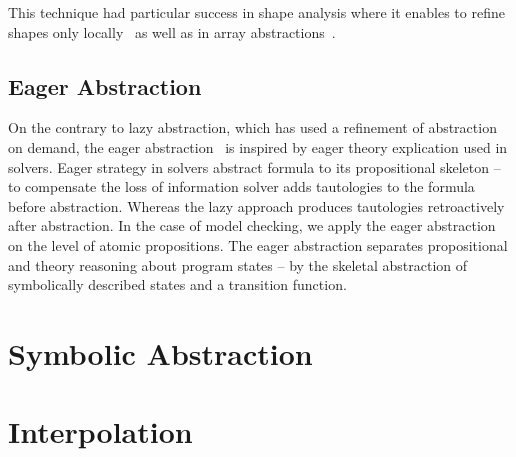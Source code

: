 This technique had particular success in shape analysis where it enables to
refine shapes only locally~\cite{Henzinger2003,Beyer2006a} as well as in array
abstractions~\cite{Alberti2012, Alberti2012b}.

\subsection{Eager Abstraction}

On the contrary to lazy abstraction, which has used a refinement of abstraction
on demand, the eager abstraction~\cite{McMillan2018} is inspired by eager
theory explication used in \smt solvers. Eager strategy in \smt solvers
abstract formula to its propositional skeleton -- to compensate the loss of
information \smt solver adds tautologies to the formula before abstraction.
Whereas the lazy approach produces tautologies retroactively after abstraction.
In the case of model checking, we apply the eager abstraction on the level of
atomic propositions. The eager abstraction separates propositional and theory
reasoning about program states -- by the skeletal abstraction of symbolically
described states and a transition function.

\section{Symbolic Abstraction}




\section{Interpolation}
\label{sec:interpolation}






\cite{Henzinger2004abstractions}

\cite{Mcmillan2003interpolation}

\cite{Jhala2007array}
